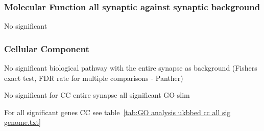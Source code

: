 \subsubsection{Molecular Function all synaptic against synaptic background}
No significant

\subsubsection{Cellular Component}
No significant biological pathway with the entire synapse as background (Fishers exact test, FDR rate for multiple comparisons - Panther)

No significant for CC entire synapse all significant GO slim

For all significant genes CC see table~\ref{tab:GO analysis ukbbed cc all sig genome.txt}
